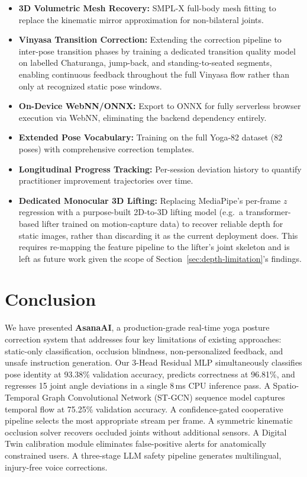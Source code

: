 \documentclass[conference]{IEEEtran}
\begin{document}
\begin{itemize}
\item \textbf{3D Volumetric Mesh Recovery:} SMPL-X full-body mesh fitting to replace the
  kinematic mirror approximation for non-bilateral joints.
\item \textbf{Vinyasa Transition Correction:} Extending the correction pipeline to
  inter-pose transition phases by training a dedicated transition quality model
  on labelled Chaturanga, jump-back, and standing-to-seated segments, enabling
  continuous feedback throughout the full Vinyasa flow rather than only at
  recognized static pose windows.
\item \textbf{On-Device WebNN/ONNX:} Export to ONNX for fully serverless browser execution
  via WebNN, eliminating the backend dependency entirely.
\item \textbf{Extended Pose Vocabulary:} Training on the full Yoga-82 dataset (82 poses)
  with comprehensive correction templates.
\item \textbf{Longitudinal Progress Tracking:} Per-session deviation history to quantify
  practitioner improvement trajectories over time.
\item \textbf{Dedicated Monocular 3D Lifting:} Replacing MediaPipe's per-frame $z$
  regression with a purpose-built 2D-to-3D lifting model (e.g.\ a transformer-based
  lifter trained on motion-capture data) to recover reliable depth for static images,
  rather than discarding it as the current deployment does. This requires re-mapping
  the feature pipeline to the lifter's joint skeleton and is left as future work
  given the scope of Section~\ref{sec:depth-limitation}'s findings.
\end{itemize}

\FloatBarrier
\section{Conclusion}
\label{sec:conclusion}

We have presented \textbf{AsanaAI}, a production-grade real-time yoga posture correction
system that addresses four key limitations of existing approaches: static-only
classification, occlusion blindness, non-personalized feedback, and unsafe instruction
generation. Our 3-Head Residual MLP simultaneously classifies pose identity at 93.38\%
validation accuracy, predicts correctness at 96.81\%, and regresses 15 joint angle
deviations in a single 8\,ms CPU inference pass. A Spatio-Temporal Graph Convolutional Network (ST-GCN)
sequence model captures temporal flow at 75.25\% validation accuracy.
A confidence-gated cooperative pipeline selects the most appropriate stream per frame.
A symmetric kinematic occlusion solver recovers occluded joints without additional sensors.
A Digital Twin calibration module eliminates false-positive alerts for anatomically
constrained users. A three-stage LLM safety pipeline generates multilingual, injury-free
voice corrections.
\end{document}
